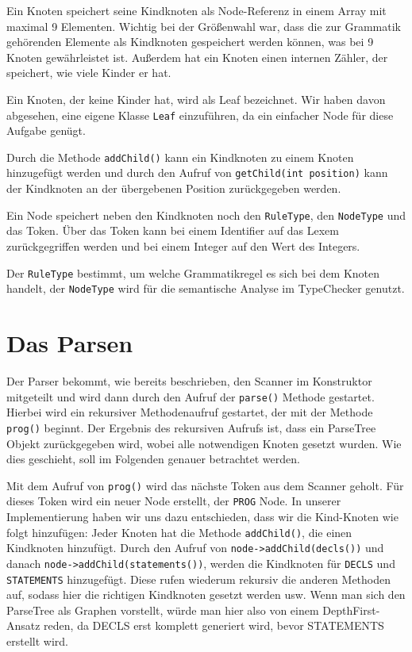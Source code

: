 Ein Knoten speichert seine Kindknoten als Node-Referenz in einem Array mit maximal 9 Elementen. Wichtig bei der Größenwahl war, dass die zur Grammatik gehörenden Elemente als Kindknoten gespeichert werden können, was bei 9 Knoten gewährleistet ist. Außerdem hat ein Knoten einen internen Zähler, der speichert, wie viele Kinder er hat.

Ein Knoten, der keine Kinder hat, wird als Leaf bezeichnet. Wir haben davon abgesehen, eine eigene Klasse \texttt{Leaf} einzuführen, da ein einfacher Node für diese Aufgabe genügt.

Durch die Methode \texttt{addChild()} kann ein Kindknoten zu einem Knoten hinzugefügt werden und durch den Aufruf von \texttt{getChild(int position)} kann der Kindknoten an der übergebenen Position zurückgegeben werden.

Ein Node speichert neben den Kindknoten noch den \texttt{RuleType}, den \texttt{NodeType} und das Token. Über das Token kann bei einem Identifier auf das Lexem zurückgegriffen werden und bei einem Integer auf den Wert des Integers.

Der \texttt{RuleType} bestimmt, um welche Grammatikregel es sich bei dem Knoten handelt, der \texttt{NodeType} wird für die semantische Analyse im TypeChecker genutzt.

\section{Das Parsen}
Der Parser bekommt, wie bereits beschrieben, den Scanner im Konstruktor mitgeteilt und wird dann durch den Aufruf der \texttt{parse()} Methode gestartet. Hierbei wird ein rekursiver Methodenaufruf gestartet, der mit der Methode \texttt{prog()} beginnt. Der Ergebnis des rekursiven Aufrufs ist, dass ein ParseTree Objekt zurückgegeben wird, wobei alle notwendigen Knoten gesetzt wurden. Wie dies geschieht, soll im Folgenden genauer betrachtet werden.

Mit dem Aufruf von \texttt{prog()} wird das nächste Token aus dem Scanner geholt. Für dieses Token wird ein neuer Node erstellt, der \texttt{PROG} Node. In unserer Implementierung haben wir uns dazu entschieden, dass wir die Kind-Knoten wie folgt hinzufügen:
Jeder Knoten hat die Methode \texttt{addChild()}, die einen Kindknoten hinzufügt. Durch den Aufruf von \texttt{node->addChild(decls())} und danach \texttt{node->addChild(statements())}, werden die Kindknoten für \texttt{DECLS} und \texttt{STATEMENTS} hinzugefügt. Diese rufen wiederum rekursiv die anderen Methoden auf, sodass hier die richtigen Kindknoten gesetzt werden usw. Wenn man sich den ParseTree als Graphen vorstellt, würde man hier also von einem DepthFirst-Ansatz reden, da DECLS erst komplett generiert wird, bevor STATEMENTS erstellt wird.

